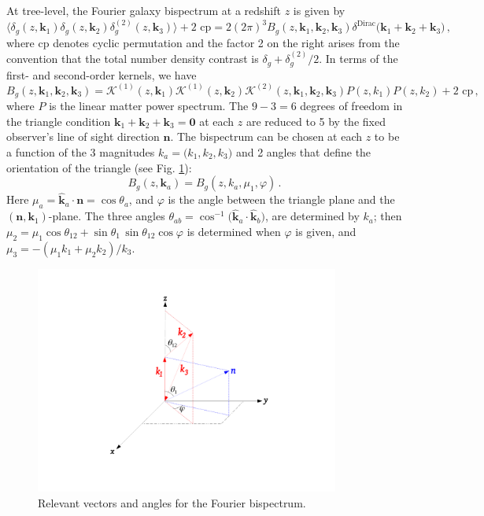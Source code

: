 At tree-level, the Fourier galaxy bispectrum at  a redshift $z$ is given by
\begin{equation}
{\big\langle \delta_g(z,\bm{k}_{1})\delta_g(z,\bm{k}_{2})\delta^{(2)}_g(z,\bm{k}_{3}) \big\rangle + \text{2 cp}=2 (2\pi)^3 B_{g}(z, \bm{k}_{1}, \bm{k}_{2}, \bm{k}_{3}) \delta^{\mathrm{Dirac}}\big(\bm{k}_{1}+ \bm{k}_{2}+ \bm{k}_{3} \big)\,,}
\end{equation}
where cp denotes cyclic permutation and the factor 2 on the right arises from the convention that the total number density contrast is $\delta_g+ \delta^{(2)}_g/2$.  
In terms of the first- and second-order kernels, we have
\begin{equation}
B_{g}(z, \bm{k}_{1}, \bm{k}_{2}, \bm{k}_{3}) = \mathcal{K}^{(1)}(z, \bm{k}_{1})\mathcal{K}^{(1)}(z, \bm{k}_{2})\mathcal{K}^{(2)}(z, \bm{k}_{1}, \bm{k}_{2}, \bm{k}_{3})P(z, k_{1})P(z, k_{2}) + \text{2 cp}\,, \label{eq:bkern}
\end{equation}
where $P$ is the linear matter power spectrum. 
The $9-3=6$ degrees of freedom in the triangle condition $\bm{k}_{1}+ \bm{k}_{2}+ \bm{k}_{3}=\bm{0}$ at each $z$ are reduced to 5 by the fixed observer's line of sight direction $\bm{n}$.
The bispectrum can be chosen at each $z$ to be a function  of the 3 magnitudes ${k_a}=\big({k}_{1}, {k}_{2},{k}_{3}\big)$ and 2 angles that define the orientation of the triangle (see Fig. \ref{fig0}):
\begin{equation}
B_{g}(z, \bm{k}_{a}) =B_{g}(z, {k}_{a},  \mu_1,\varphi) \,.
\end{equation}
Here $\mu_a=\hat{\bm{k}}_a\cdot\bm{n}=\cos\theta_a$,  and $\varphi$ is the angle between the triangle plane and the $(\bm{n},\bm{k}_1)$-plane. The three angles $\theta_{ab}= \cos^{-1}\big(\hat{\bm{k}}_{a} \cdot \hat{\bm{k}}_b\big)$, are determined by $k_a$; then $\mu_2=\mu_1\cos\theta_{12}+ \sin\theta_1\,\sin\theta_{12}\cos\varphi$ is determined when $\varphi$ is given, and $\mu_3=-(\mu_1k_1+\mu_2k_2)/k_3$.
\begin{figure}[ht]
\centering
\includegraphics[width=10.0cm]{fig/geometryAngles}
\vspace*{-1cm}
\caption{Relevant vectors and angles for the Fourier bispectrum.} \label{fig0}
\end{figure}

